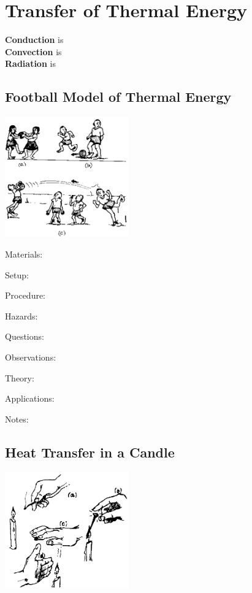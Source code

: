 \section{Transfer of Thermal Energy}

\textbf{Conduction} is\\
\textbf{Convection} is \\
\textbf{Radiation} is

\begin{multicols}{2}


\subsection{Football Model of Thermal Energy}

\begin{center}
\includegraphics[width=0.4\textwidth]{./img/source/football-thermal.png}
\end{center}

\begin{description*}
\item[Materials:]{}
\item[Setup:]{}
\item[Procedure:]{}
\item[Hazards:]{}
\item[Questions:]{}
\item[Observations:]{}
\item[Theory:]{}
\item[Applications:]{}
\item[Notes:]{}
\end{description*}

\subsection{Heat Transfer in a Candle}

\begin{center}
\includegraphics[width=0.4\textwidth]{./img/source/heat-trans-candle.png}
\end{center}


\end{multicols}
